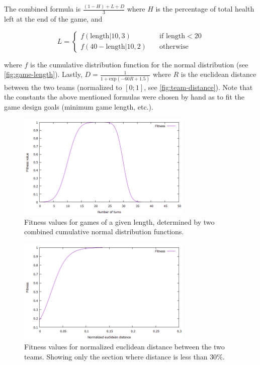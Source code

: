 The combined formula is $\frac{(1 - H) + L + D}{3}$ where $H$ is the percentage of total health left at the end of the game, and

\[
L = \begin{cases}
f(\text{length} | 10, 3) &\quad\text{if length} < 20 \\
f(40 - \text{length} | 10, 2) &\quad\text{otherwise}
\end{cases}
\]

where $f$ is the cumulative distribution function for the normal distribution (see \autoref{fig:game-length}). Lastly, $D = \frac{1}{1 + \text{exp}(-60R + 1.5)}$ where $R$ is the euclidean distance between the two teams (normalized to $[0;1]$, see \autoref{fig:team-distance}). Note that the constants the above mentioned formulas were chosen by hand as to fit the game design goals (minimum game length, etc.).

\begin{figure}
	\centering
	\includegraphics[width=0.75\textwidth]{img/game-length-fitness.png}
	\caption{Fitness values for games of a given length, determined by two combined cumulative normal distribution functions.}
	\label{fig:game-length}	
\end{figure}

\begin{figure}
	\centering
	\includegraphics[width=0.75\textwidth]{img/team-distance.png}
	\caption{Fitness values for normalized euclidean distance between the two teams. Showing only the section where distance is less than $30\%$.}
	\label{fig:team-distance}	
\end{figure}


